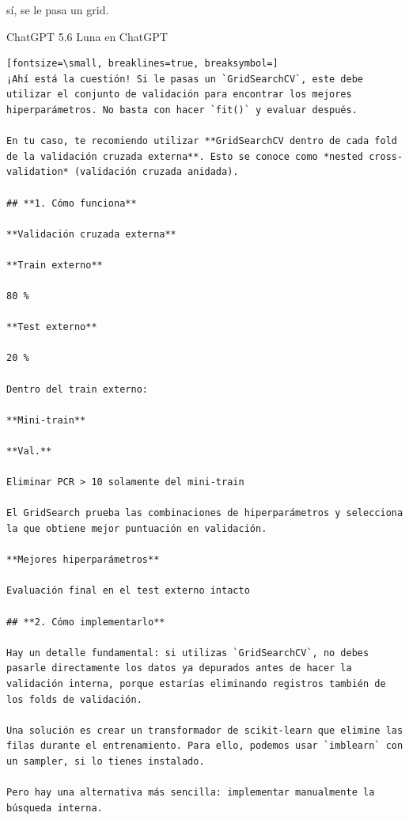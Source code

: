 \documentclass[12pt,a4paper,oneside]{book}
\begin{document}
\begin{iaprompt}
sí, se le pasa un grid.
\end{iaprompt}
\begin{iaresp}{ChatGPT 5.6 Luna en ChatGPT}
\begin{Verbatim}[fontsize=\small, breaklines=true, breaksymbol=]
¡Ahí está la cuestión! Si le pasas un `GridSearchCV`, este debe utilizar el conjunto de validación para encontrar los mejores hiperparámetros. No basta con hacer `fit()` y evaluar después.

En tu caso, te recomiendo utilizar **GridSearchCV dentro de cada fold de la validación cruzada externa**. Esto se conoce como *nested cross-validation* (validación cruzada anidada).

## **1. Cómo funciona**

**Validación cruzada externa**

**Train externo**

80 %

**Test externo**

20 %

Dentro del train externo:

**Mini-train**

**Val.**

Eliminar PCR > 10 solamente del mini-train

El GridSearch prueba las combinaciones de hiperparámetros y selecciona la que obtiene mejor puntuación en validación.

**Mejores hiperparámetros**

Evaluación final en el test externo intacto

## **2. Cómo implementarlo**

Hay un detalle fundamental: si utilizas `GridSearchCV`, no debes pasarle directamente los datos ya depurados antes de hacer la validación interna, porque estarías eliminando registros también de los folds de validación.

Una solución es crear un transformador de scikit-learn que elimine las filas durante el entrenamiento. Para ello, podemos usar `imblearn` con un sampler, si lo tienes instalado.

Pero hay una alternativa más sencilla: implementar manualmente la búsqueda interna.


\end{Verbatim}
\end{iaresp}
\end{document}
